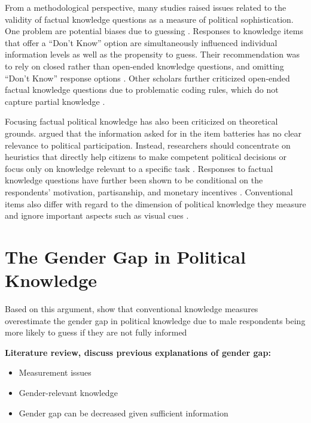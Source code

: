 \documentclass[12pt]{article}
\begin{document}
From a methodological perspective, many studies raised issues related to the validity of factual knowledge questions as a measure of political sophistication. One problem  are potential biases due to guessing \citep{mondak2000reconsidering,mondak2001developing,mondak2001asked,miller2008experimenting}. Responses to knowledge items that offer a ``Don't Know'' option are simultaneously influenced individual information levels as well as the propensity to guess. Their recommendation was to rely on closed rather than open-ended knowledge questions, and omitting ``Don't Know'' response options \citep[but see][]{sturgis2008experiment,luskin2011don}. Other scholars further criticized open-ended factual knowledge questions due to problematic coding rules, which do not capture partial knowledge \citep{krosnick2008problems,gibson2009knowing,debell2013harder}.

Focusing factual political knowledge has also been criticized on theoretical grounds. \citet{lupia2006elitism} argued that the information asked for in the item batteries has no clear relevance to political participation. Instead, researchers should concentrate on heuristics that directly help citizens to make competent political decisions or focus only on knowledge relevant to a specific task \citep[see also][]{lupia1994shortcuts}. Responses to factual knowledge questions have further been shown to be conditional on the respondents' motivation, partisanship, and monetary incentives \citep{prior2008money,bullock2015partisan,prior2015you}. Conventional items also differ with regard to the dimension of political knowledge they measure \citep{barabas2014question} and ignore important aspects such as visual cues \citep{prior2014visual}.



\section*{The Gender Gap in Political Knowledge}


Based on this argument, \citet{mondak2004knowledge} show that conventional knowledge measures overestimate the gender gap in political knowledge due to male respondents being more likely to guess if they are not fully informed \citep[see also][]{pietryka2013analysis}

\noindent \textbf{Literature review, discuss previous explanations of gender gap:}
\begin{itemize}\singlespacing
\item Measurement issues \citep[e.g.][]{mondak2004knowledge}
\item Gender-relevant knowledge \citep[e.g.][]{dolan2011women}
\item Gender gap can be decreased given sufficient information \citep[e.g.][]{jerit2017revisiting}
\end{itemize}
\end{document}

